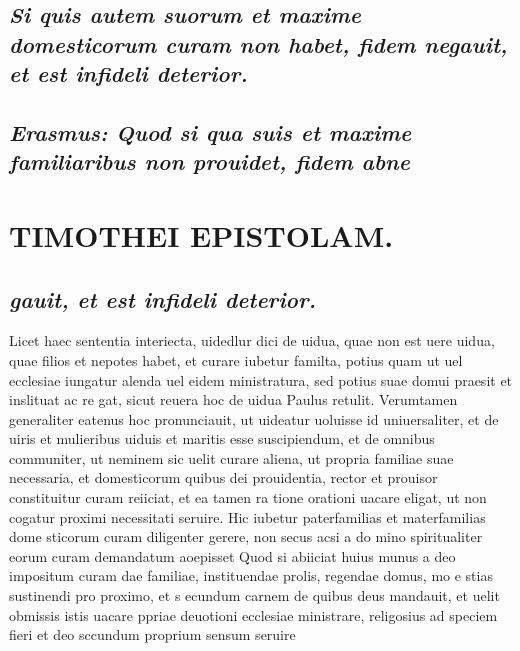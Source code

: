 \documentclass{article}
\begin{document}
\begin{pages}
\subsection*{\textit{Si quis autem suorum et maxime domesticorum curam non habet, fidem negauit, et est infideli deterior. }}
{}
\subsection*{\textit{Erasmus: Quod si qua suis et maxime familiaribus non prouidet, fidem abne}}
\section*{TIMOTHEI EPISTOLAM. }
\marginpar{[ p.121 ]}
{}
\subsection*{\textit{gauit, et est infideli deterior. }}\pstart Licet haec sententia interiecta, uidedlur dici de uidua, quae non est uere uidua, quae filios et nepotes habet, et curare iubetur familta, potius quam ut uel ecclesiae iungatur alenda uel eidem ministratura, sed potius suae domui praesit et inslituat ac re gat, sicut reuera hoc de uidua Paulus retulit. Verumtamen generaliter eatenus hoc pronunciauit, ut uideatur uoluisse id uniuersaliter, et de uiris et mulieribus uiduis et maritis esse suscipiendum, et de omnibus communiter, ut neminem sic uelit curare aliena, ut propria familiae suae necessaria, et domesticorum quibus dei prouidentia, rector et prouisor constituitur curam reiiciat, et ea tamen ra tione orationi uacare eligat, ut non cogatur proximi necessitati seruire.  \pend\pstart Hic iubetur paterfamilias et materfamilias dome sticorum curam diligenter gerere, non secus acsi a do mino spiritualiter eorum curam demandatum aoepisset Quod si abiiciat huius munus a deo impositum curam dae familiae, instituendae prolis, regendae domus, mo e stias sustinendi pro proximo, et s ecundum carnem de quibus deus mandauit, et uelit obmissis istis uacare ppriae deuotioni ecclesiae ministrare, religosius ad speciem fieri et deo sccundum proprium sensum seruire  \pend

\end{pages}
\end{document}
